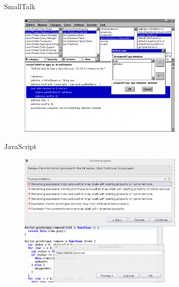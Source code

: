 \documentclass[xcolor=dvipsnames, 14pt]{beamer}
\begin{document}
\begin{frame}{SmallTalk}
  \begin{figure}[htbp]
    \centering
    \includegraphics[width=0.7\textwidth]{img/smalltalk.png}
    \label{fig:Smalltalk}
  \end{figure}
\end{frame}

\begin{frame}{JavaScript}
  \begin{figure}[htbp]
    \centering
    \includegraphics[width=0.7\textwidth]{img/Javascript.png}
    \label{fig:JavaScript}
  \end{figure}
\end{frame}
\end{document}
